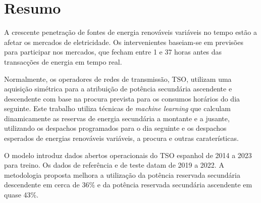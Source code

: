 \chapter{Resumo}
\justifying
A crescente penetração de fontes de energia renováveis variáveis no tempo estão a afetar os mercados de eletricidade. Os intervenientes baseiam-se em previsões para participar nos mercados, que fecham entre 1 e 37 horas antes das transacções de energia em tempo real.\par
Normalmente, os operadores de redes de transmissão, \gls{TSO}, utilizam uma aquisição simétrica para a atribuição de potência secundária ascendente e descendente com base na procura prevista para os consumos horários do dia seguinte. Este trabalho utiliza técnicas de \emph{machine learning} que calculam dinamicamente as reservas de energia secundária a montante e a jusante, utilizando os despachos programados para o dia seguinte e os despachos esperados de energias renováveis variáveis, a procura e outras caraterísticas.\par
O modelo introduz dados abertos operacionais do \gls{TSO} espanhol de 2014 a 2023 para treino. Os dados de referência e de teste datam de 2019 a 2022. A metodologia proposta melhora a utilização da potência reservada secundária descendente em cerca de 36\% e da potência reservada secundária ascendente em quase 43\%. \par


\vspace{0.5cm} %

